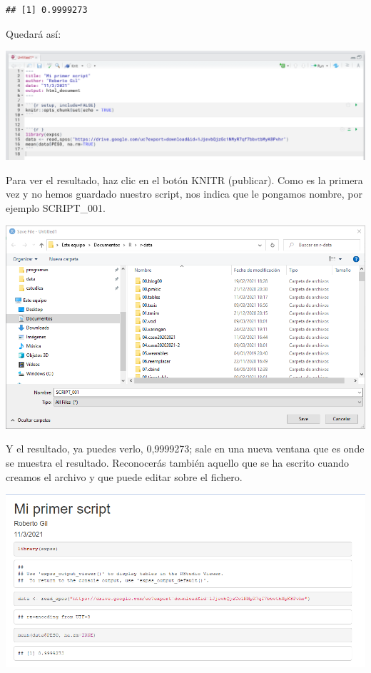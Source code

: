 \documentclass[
]{book}
\newenvironment{Shaded}{\begin{snugshade}}{\end{snugshade}}
\newcommand{\AttributeTok}[1]{\textcolor[rgb]{0.77,0.63,0.00}{#1}}
\newcommand{\ConstantTok}[1]{\textcolor[rgb]{0.00,0.00,0.00}{#1}}
\newcommand{\FunctionTok}[1]{\textcolor[rgb]{0.00,0.00,0.00}{#1}}
\newcommand{\NormalTok}[1]{#1}
\newcommand{\SpecialCharTok}[1]{\textcolor[rgb]{0.00,0.00,0.00}{#1}}
\begin{document}
\begin{Shaded}
\end{Shaded}

\begin{verbatim}
## [1] 0.9999273
\end{verbatim}

Quedará así:

\includegraphics{data/RS10.png}

Para ver el resultado, haz clic en el botón KNITR (publicar). Como es la primera vez y no hemos guardado nuestro script, nos indica que le pongamos nombre, por ejemplo SCRIPT\_001.

\includegraphics{data/RS11.png}

Y el resultado, ya puedes verlo, 0,9999273; sale en una nueva ventana que es onde se muestra el resultado. Reconocerás también aquello que se ha escrito cuando creamos el archivo y que puede editar sobre el fichero.

\includegraphics{data/RS12.png}
\end{document}
